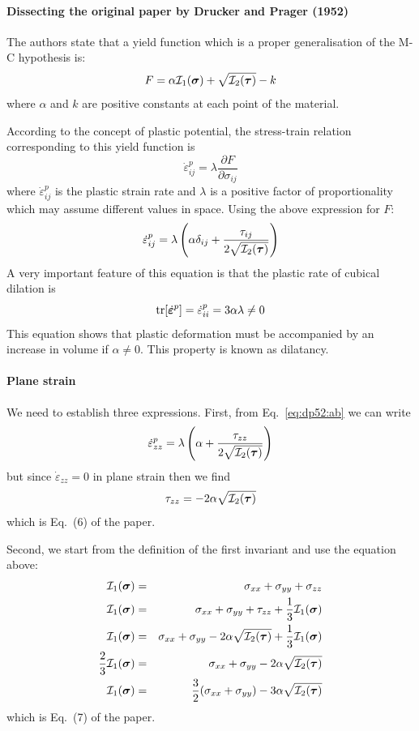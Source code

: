 \paragraph{Dissecting the original paper by Drucker and Prager (1952)}


The authors state that a yield function which is a proper generalisation of the M-C hypothesis is:
\[
F = \alpha {\cal I}_1(\bm\sigma) + \sqrt{{\cal I}_2(\bm\tau)} - k
\]
where $\alpha$ and $k$ are positive constants at each point of the material.

According to the concept of plastic potential, the stress-train relation
corresponding to this yield function is 
\[
\dot\varepsilon_{ij}^{p} = \lambda \frac{\partial F}{\partial \sigma_{ij}}
\]
where $\dot\varepsilon_{ij}^{p}$ is the plastic strain rate and $\lambda$
is a positive factor of proportionality which may assume different values in space. Using the above expression for $F$:
\begin{equation}
\dot\varepsilon_{ij}^{p} = \lambda \left( \alpha \delta_{ij} + \frac{\tau_{ij}}{2\sqrt{{\cal I}_2(\bm\tau)}} \right)
\label{eq:dp52:ab}
\end{equation}
A very important feature of this equation is that the plastic rate of cubical
dilation is 
\begin{equation}
{\rm tr}[\dot{\bm \varepsilon}^{p}]
=\dot\varepsilon_{ii}^{p} = 3 \alpha \lambda \ne 0
\label{eq:dp52:bc}
\end{equation}
This equation shows that plastic deformation must be accompanied by an increase
in volume if $\alpha\ne 0$. This property is known as dilatancy.

\paragraph{Plane strain} 
We need to establish three expressions.  
First, from Eq.~\eqref{eq:dp52:ab} we can write 
\[
\dot\varepsilon_{zz}^{p} = \lambda \left( \alpha  + \frac{\tau_{zz}}{2\sqrt{{\cal I}_2(\bm\tau)}} \right)
\]
but since $\dot\varepsilon_{zz}=0$ in plane strain then we find
\begin{equation}
\tau_{zz} = - 2 \alpha \sqrt{{\cal I}_2(\bm\tau)}
\end{equation}
which is Eq.~(6) of the paper. 

Second, we start from the definition of the first invariant and use the equation above:
\begin{eqnarray}
{\cal I}_1(\bm \sigma)&=& \sigma_{xx}+\sigma_{yy}+\sigma_{zz} \nonumber\\
{\cal I}_1(\bm \sigma)&=& \sigma_{xx}+\sigma_{yy}+\tau_{zz}+\frac13 {\cal I}_1(\bm \sigma) \nonumber\\
{\cal I}_1(\bm \sigma)&=& \sigma_{xx}+\sigma_{yy}- 2 \alpha \sqrt{{\cal I}_2(\bm\tau)} 
+\frac13 {\cal I}_1(\bm \sigma)\nonumber\\
\frac23 {\cal I}_1(\bm \sigma)&=& \sigma_{xx}+\sigma_{yy}- 2 \alpha \sqrt{{\cal I}_2(\bm\tau)} \nonumber\\
{\cal I}_1(\bm \sigma)&=& \frac32(\sigma_{xx}+\sigma_{yy})- 3 \alpha \sqrt{{\cal I}_2(\bm\tau)} 
\end{eqnarray}
which is Eq.~(7) of the paper.

